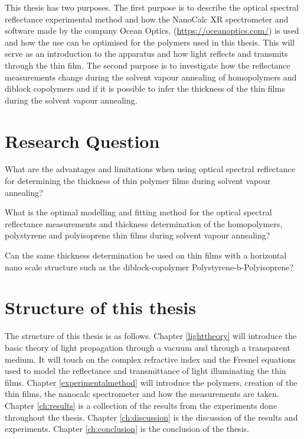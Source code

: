 \documentclass[MasterThesisMain.tex]{subfiles}
\begin{document}
This thesis has two purposes. The first purpose is to describe the optical spectral reflectance experimental method and how the NanoCalc XR spectrometer and software made by the company Ocean Optics, (\url{https://oceanoptics.com/}) is used and how the use can be optimised for the polymers used in this thesis. This will serve as an introduction to the apparatus and how light reflects and transmits through the thin film. The second purpose is to investigate how the reflectance measurements change during the solvent vapour annealing of homopolymers and diblock copolymers and if it is possible to infer the thickness of the thin films during the solvent vapour annealing. 

\section{Research Question}
What are the advantages and limitations when using optical spectral reflectance for determining the thickness of thin polymer films during solvent vapour annealing?

What is the optimal modelling and fitting method for the optical spectral reflectance measurements and thickness determination of the homopolymers, polystyrene and polyisoprene thin films during solvent vapour annealing?  
		
Can the same thickness determination be used on thin films with a horizontal nano scale structure such as the diblock-copolymer Polystyrene-b-Polyisoprene?

\section{Structure of this thesis} 
The structure of this thesis is as follows. Chapter \ref{lighttheory} will introduce the basic theory of light propagation through a vacuum and through a transparent medium. It will touch on the complex refractive index and the Fresnel equations used to model the reflectance and transmittance of light illuminating the thin films. Chapter \ref{experimentalmethod} will introduce the polymers, creation of the thin films, the nanocalc spectrometer and how the measurements are taken.  Chapter \ref{ch:results} is a collection of the results from the experiments done throughout the thesis. Chapter \ref{ch:discussion} is the discussion of the results and experiments. Chapter \ref{ch:conclusion} is the conclusion of the thesis.

        
\end{document}
